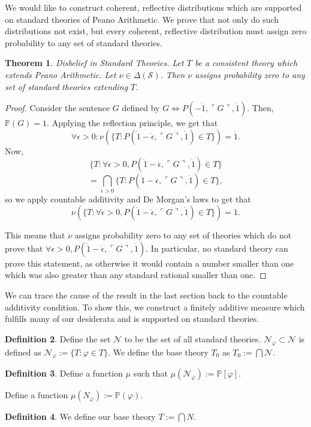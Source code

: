 \documentclass[12pt]{article}
\newcommand{\PP}{\mathbb{P}}
\newcommand{\vp}{\varphi}
\theoremstyle{plain}
\newtheorem{theorem}{Theorem}[subsection]
\theoremstyle{definition}
\newtheorem{definition}[theorem]{Definition}
\theoremstyle{remark}
\begin{document}
We would like to construct coherent, reflective distributions which are supported on standard theories of Peano Arithmetic.
We prove that not only do such distributions not exist, but every coherent, reflective distribution must assign zero probability to any set of standard theories. 
\begin{theorem} \emph{Disbelief in Standard Theories.}
Let $T$ be a consistent theory which extends Peano Arithmetic.
Let $\nu\in\Delta(\mathcal{S})$.
Then $\nu$ assigns probability zero to any set of standard theories extending $T$.
\end{theorem}
\begin{proof}
Consider the sentence $G$ defined by $G \iff P(-\dot 1,\ulcorner G\urcorner,\dot 1)$. Then, $\mathbb{P}(G)=1$.
Applying the reflection principle, we get that
$$\forall\epsilon>0: \nu(\{T:P(\dot 1-\dot \epsilon,\ulcorner G\urcorner,\dot 1)\in T\})=\dot 1.$$
Now,
$$\{T:\forall \epsilon>0,P(\dot 1-\dot \epsilon,\ulcorner G\urcorner,\dot 1)\in T\}$$
$$=\bigcap_{\epsilon>0}\{T:P(\dot 1-\dot \epsilon,\ulcorner G\urcorner,\dot 1)\in T\},$$
so we apply countable additivity and De Morgan's laws to get that $$\nu(\{T:\forall \dot\epsilon>0,P(\dot 1-\dot \epsilon,\ulcorner G\urcorner,\dot 1)\in T\})=1.$$

This means that $\nu$ assigns probability zero to any set of theories which do not prove that $\forall \epsilon>0,P(\dot 1-\dot \epsilon,\ulcorner G\urcorner,\dot 1)$. 
In particular, no standard theory can prove this statement, as otherwise it would contain a number smaller than one which was also greater than any standard rational smaller than one.
\end{proof}
We can trace the cause of the result in the last section back to the countable additivity condition. To show this, we construct a finitely additive measure which fulfills many of our desiderata and is supported on standard theories.
\begin{definition}
Define the set $\mathcal{N}$ to be the set of all standard theories. $\mathcal{N}_{\varphi}\subset \mathcal{N}$ is defined as $\mathcal{N} _{\varphi}:=\{T:\varphi\in T\}$.
We define the base theory $T_0$ as $T_0:=\bigcap \mathcal{N}$.
\end{definition}
\begin{definition}
Define a function $\mu$ such that $\mu(\mathcal{N}_{\varphi}):=\mathbb{P}[\varphi]$.

Define a function $\mu(N_{\vp}):=\PP(\vp)$.
\end{definition}
\begin{definition}
We define our base theory $T:=\bigcap N$.
\end{definition}
\end{document}
